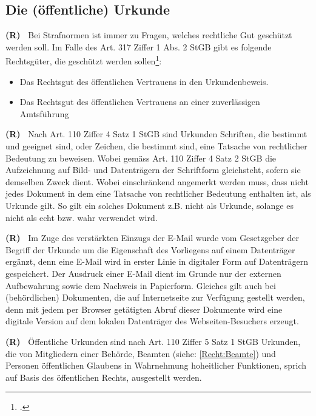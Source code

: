 \documentclass[paper=a4,fontsize=12pt, oneside, numbers=noenddot]{scrbook}
\newcounter{rz}
\newcommand{\Rz}{
	\addtocounter{rz}{1}\textbf{(R\arabic{rz})~}
}
\begin{document}
\subsection{Die (öffentliche) Urkunde}
\Rz Bei Strafnormen ist immer zu Fragen, welches rechtliche Gut geschützt werden soll. Im Falle des Art. 317 Ziffer 1 Abs. 2 StGB gibt es folgende Rechtsgüter, die geschützt werden sollen\footcite[Art. 317, Rz. 1]{2020:Wohlers:StGBHandkommentar}:

\begin{itemize}[noitemsep]\setlength\itemsep{0.3em}
\item Das Rechtsgut des öffentlichen Vertrauens in den Urkundenbeweis.
\item Das Rechtsgut des öffentlichen Vertrauens an einer zuverlässigen Amtsführung
\end{itemize} 

\Rz Nach Art. 110 Ziffer 4 Satz 1 StGB sind Urkunden Schriften, die bestimmt und geeignet sind, oder Zeichen, die bestimmt sind, eine Tatsache von rechtlicher Bedeutung zu beweisen. Wobei  gemäss Art. 110 Ziffer 4 Satz 2 StGB die Aufzeichnung auf Bild- und Datenträgern der Schriftform gleichsteht, sofern sie demselben Zweck dient. Wobei einschränkend angemerkt werden muss, dass nicht jedes Dokument in dem eine Tatsache von rechtlicher Bedeutung enthalten ist, als Urkunde gilt. So gilt ein solches Dokument z.B. nicht als Urkunde, solange es nicht als echt bzw. wahr verwendet wird. 

\Rz Im Zuge des verstärkten Einzugs der E-Mail wurde vom Gesetzgeber der Begriff der Urkunde um die Eigenschaft des Vorliegens auf einem Datenträger ergänzt, denn eine E-Mail wird in erster Linie in digitaler Form auf Datenträgern gespeichert. Der Ausdruck einer E-Mail dient im Grunde nur der externen Aufbewahrung sowie dem Nachweis in Papierform. Gleiches gilt auch bei (behördlichen) Dokumenten, die auf Internetseite zur Verfügung gestellt werden, denn mit jedem per Browser getätigten Abruf dieser Dokumente wird eine digitale Version auf dem lokalen Datenträger des Webseiten-Besuchers erzeugt. 

\Rz Öffentliche Urkunden sind nach Art. 110 Ziffer 5 Satz 1 StGB  Urkunden, die von Mitgliedern einer Behörde, Beamten (siehe: \ref{Recht:Beamte})  und Personen öffentlichen Glaubens in Wahrnehmung hoheitlicher Funktionen, sprich auf Basis des öffentlichen Rechts, ausgestellt werden. 
\end{document}
